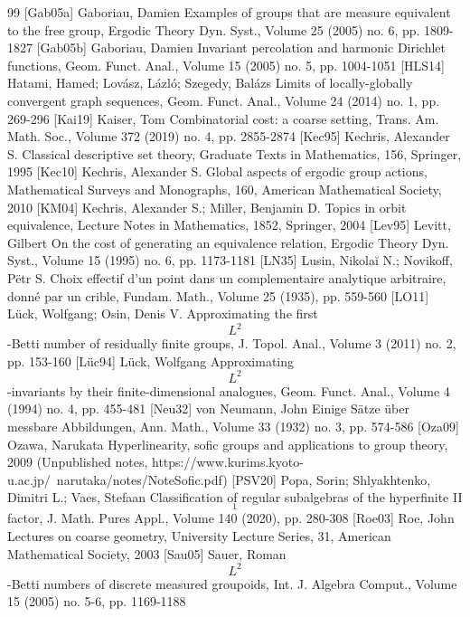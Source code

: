 \begin{thebibliography}{99}
 [Gab05a] Gaboriau, Damien Examples of groups that are measure equivalent to the free group, Ergodic Theory Dyn. Syst., Volume 25 (2005) no. 6, pp. 1809-1827
 [Gab05b] Gaboriau, Damien Invariant percolation and harmonic Dirichlet functions, Geom. Funct. Anal., Volume 15 (2005) no. 5, pp. 1004-1051
 [HLS14] Hatami, Hamed; Lovász, Lázló; Szegedy, Balázs Limits of locally-globally convergent graph sequences, Geom. Funct. Anal., Volume 24 (2014) no. 1, pp. 269-296
 [Kai19] Kaiser, Tom Combinatorial cost: a coarse setting, Trans. Am. Math. Soc., Volume 372 (2019) no. 4, pp. 2855-2874
 [Kec95] Kechris, Alexander S. Classical descriptive set theory, Graduate Texts in Mathematics, 156, Springer, 1995
 [Kec10] Kechris, Alexander S. Global aspects of ergodic group actions, Mathematical Surveys and Monographs, 160, American Mathematical Society, 2010
 [KM04] Kechris, Alexander S.; Miller, Benjamin D. Topics in orbit equivalence, Lecture Notes in Mathematics, 1852, Springer, 2004
 [Lev95] Levitt, Gilbert On the cost of generating an equivalence relation, Ergodic Theory Dyn. Syst., Volume 15 (1995) no. 6, pp. 1173-1181
 [LN35] Lusin, Nikolaĭ N.; Novikoff, Pëtr S. Choix effectif d’un point dans un complementaire analytique arbitraire, donné par un crible, Fundam. Math., Volume 25 (1935), pp. 559-560
 [LO11] Lück, Wolfgang; Osin, Denis V. Approximating the first $${L}^2$$-Betti number of residually finite groups, J. Topol. Anal., Volume 3 (2011) no. 2, pp. 153-160
 [Lüc94] Lück, Wolfgang Approximating $${L}^2$$-invariants by their finite-dimensional analogues, Geom. Funct. Anal., Volume 4 (1994) no. 4, pp. 455-481
 [Neu32] von Neumann, John Einige Sätze über messbare Abbildungen, Ann. Math., Volume 33 (1932) no. 3, pp. 574-586
 [Oza09] Ozawa, Narukata Hyperlinearity, sofic groups and applications to group theory, 2009 (Unpublished notes, https://www.kurims.kyoto-u.ac.jp/~narutaka/notes/NoteSofic.pdf)
 [PSV20] Popa, Sorin; Shlyakhtenko, Dimitri L.; Vaes, Stefaan Classification of regular subalgebras of the hyperfinite II$$_1$$ factor, J. Math. Pures Appl., Volume 140 (2020), pp. 280-308
 [Roe03] Roe, John Lectures on coarse geometry, University Lecture Series, 31, American Mathematical Society, 2003
 [Sau05] Sauer, Roman $${L}^2$$-Betti numbers of discrete measured groupoids, Int. J. Algebra Comput., Volume 15 (2005) no. 5-6, pp. 1169-1188

\end{thebibliography}
